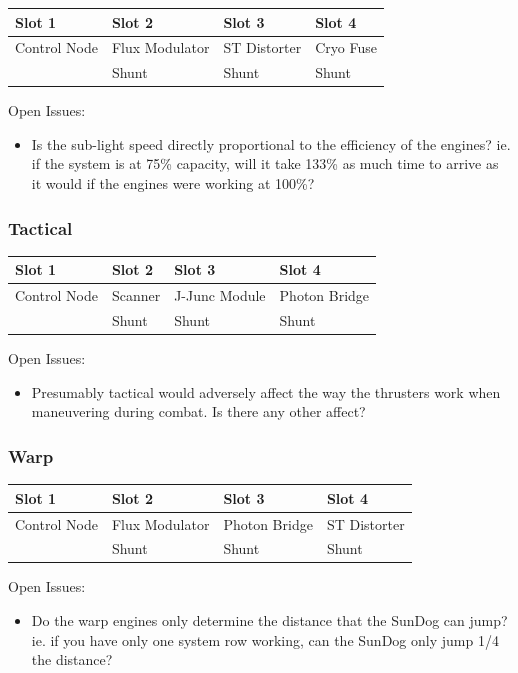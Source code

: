 \begin{tabular}{ | p{2.5cm} | p{2.5cm} | p{2.5cm} | p{2.5cm} | }
\hline
Slot 1 & Slot 2 & Slot 3 & Slot 4 \\ \hline
Control Node & Flux Modulator & ST Distorter & Cryo Fuse\\
& Shunt & Shunt & Shunt \\
\hline
\end{tabular}

Open Issues:
\begin{itemize}
\item Is the sub-light speed directly proportional to the efficiency
of the engines?  ie. if the system is at 75\% capacity, will it take
133\% as much time to arrive as it would if the engines were working at
100\%?
\end{itemize}

\subsubsection{Tactical}

\begin{tabular}{ | p{2.5cm} | p{2.5cm} | p{2.5cm} | p{2.5cm} | }
\hline
Slot 1 & Slot 2 & Slot 3 & Slot 4 \\ \hline
Control Node & Scanner & J-Junc Module & Photon Bridge \\
& Shunt & Shunt & Shunt \\
\hline
\end{tabular}

Open Issues:
\begin{itemize}
\item Presumably tactical would adversely affect the way the thrusters
work when maneuvering during combat.  Is there any other affect?
\end{itemize}

\subsubsection{Warp}

\begin{tabular}{ | p{2.5cm} | p{2.5cm} | p{2.5cm} | p{2.5cm} | }
\hline
Slot 1 & Slot 2 & Slot 3 & Slot 4 \\ \hline
Control Node & Flux Modulator & Photon Bridge & ST Distorter \\
& Shunt & Shunt & Shunt \\
\hline
\end{tabular}

Open Issues:
\begin{itemize}
\item Do the warp engines only determine the distance that the SunDog
can jump?  ie. if you have only one system row working, can the SunDog
only jump 1/4 the distance?
\end{itemize}

